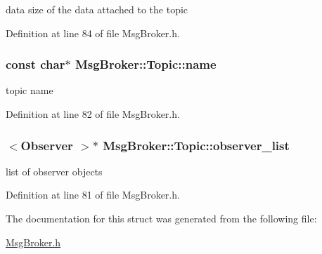 data size of the data attached to the topic 



Definition at line 84 of file Msg\-Broker.\-h.

\hypertarget{struct_msg_broker_1_1_topic_a6cdd55155171ef025ab20f3a7c1b5091}{
\subsubsection[{name}]{\setlength{\rightskip}{0pt plus 5cm}const char$\ast$ Msg\-Broker\-::\-Topic\-::name}}\label{struct_msg_broker_1_1_topic_a6cdd55155171ef025ab20f3a7c1b5091}


topic name 



Definition at line 82 of file Msg\-Broker.\-h.

\hypertarget{struct_msg_broker_1_1_topic_a6109a82a783cc81a889a6ddef5af5ecc}{
\subsubsection[{observer\-\_\-list}]{$<${\bf Observer} $>$$\ast$ Msg\-Broker\-::\-Topic\-::observer\-\_\-list}}\label{struct_msg_broker_1_1_topic_a6109a82a783cc81a889a6ddef5af5ecc}


list of observer objects 



Definition at line 81 of file Msg\-Broker.\-h.



The documentation for this struct was generated from the following file\-:\begin{DoxyCompactItemize}
\item 
\hyperlink{_msg_broker_8h}{Msg\-Broker.\-h}\end{DoxyCompactItemize}
